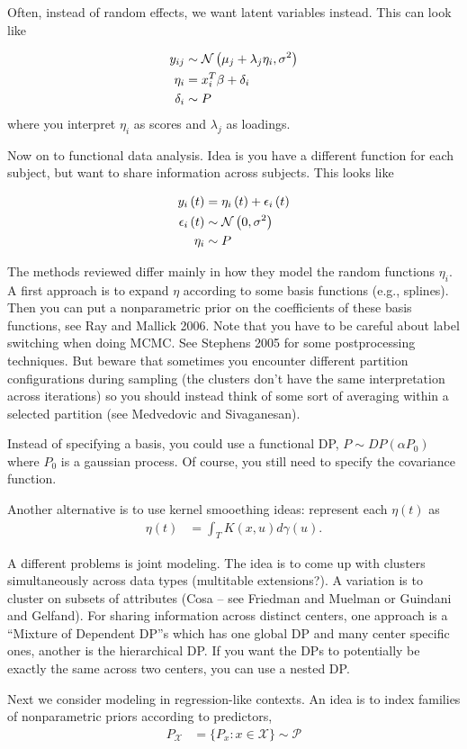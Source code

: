 \documentclass{article}
\begin{document}
Often, instead of random effects, we want latent variables instead. This can
look like

\begin{align}
  y_{ij} &\sim \mathcal{N}\left(\mu_{j} + \lambda_{j} \eta_{i}, \sigma^{2}\right) \\
  \eta_{i} &= x_{i}^{T}\beta + \delta_{i} \\
  \delta_{i} &\sim P
\end{align}
where you interpret $\eta_{i}$ as scores and $\lambda_{j}$ as loadings.

Now on to functional data analysis. Idea is you have a different function for
each subject, but want to share information across subjects. This looks like

\begin{align}
  y_{i}\left(t\right) &= \eta_{i}\left(t\right) + \epsilon_{i}\left(t\right) \\
  \epsilon_{i}\left(t\right) &\sim \mathcal{N}\left(0, \sigma^{2}\right) \\
  \eta_{i} &\sim P
\end{align}

The methods reviewed differ mainly in how they model the random functions
$\eta_{i}$. A first approach is to expand $\eta$ according to some basis
functions (e.g., splines). Then you can put a nonparametric prior on the
coefficients of these basis functions, see Ray and Mallick 2006. Note that you
have to be careful about label switching when doing MCMC. See Stephens 2005 for
some postprocessing techniques. But beware that sometimes you encounter
different partition configurations during sampling (the clusters don't have the
same interpretation across iterations) so you should instead think of some sort
of averaging within a selected partition (see Medvedovic and Sivaganesan).

Instead of specifying a basis, you could use a functional DP,
$P \sim DP\left(\alpha P_{0}\right)$ where $P_{0}$ is a gaussian process. Of
course, you still need to specify the covariance function.

Another alternative is to use kernel smooething ideas: represent each
$\eta\left(t\right)$ as
\begin{align}
\eta\left(t\right) &= \int_{T} K\left(x, u\right) d\gamma\left(u\right).
\end{align}

A different problems is joint modeling. The idea is to come up with clusters
simultaneously across data types (multitable extensions?). A variation is to
cluster on subsets of attributes (Cosa -- see Friedman and Muelman or Guindani
and Gelfand). For sharing information across distinct centers, one approach is a
``Mixture of Dependent DP''s which has one global DP and many center specific
ones, another is the hierarchical DP. If you want the DPs to potentially be
exactly the same across two centers, you can use a nested DP.

Next we consider modeling in regression-like contexts. An idea is to index
families of nonparametric priors according to predictors,
\begin{align}
P_{\mathcal{X}} &= \{P_{x} : x \in \mathcal{X}\} \sim \mathcal{P}
\end{align}
\end{document}
